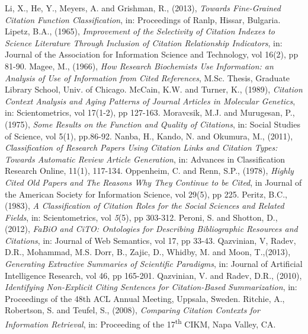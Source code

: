 \documentclass[runningheads,a4paper]{llncs}
\begin{document}
\begin{thebibliography}{4}
 Li, X., He, Y., Meyers, A. and Grishman, R., (2013), {\em Towards Fine-Grained Citation Function Classification}, in: Proceedings of Ranlp, Hissar, Bulgaria.
 Lipetz, B.A., (1965), {\em Improvement of the Selectivity of Citation Indexes to Science Literature Through Inclusion of Citation Relationship Indicators}, in: Journal of the Association for Information Science and Technology, vol 16(2), pp 81-90.
 Magee, M., (1966), {\em How Research Biochemists Use Information: an Analysis of Use of Information from Cited References}, M.Sc. Thesis, Graduate Library School, Univ. of Chicago.
 McCain, K.W. and Turner, K., (1989), {\em Citation Context Analysis and Aging Patterns of Journal Articles in Molecular Genetics}, in: Scientometrics, vol 17(1-2), pp 127-163.
 Moravcsik, M.J. and Murugesan, P., (1975), {\em Some Results on the Function and Quality of Citations}, in: Social Studies of Science, vol 5(1), pp.86-92.
 Nanba, H., Kando, N. and Okumura, M., (2011), {\em Classification of Research Papers Using Citation Links and Citation Types: Towards Automatic Review Article Generation}, in: Advances in Classification Research Online, 11(1), 117-134.
 Oppenheim, C. and Renn, S.P., (1978), {\em Highly Cited Old Papers and The Reasons Why They Continue to be Cited}, in Journal of the American Society for Information Science, vol 29(5), pp 225.
 Peritz, B.C., (1983), {\em A Classification of Citation Roles for the Social Sciences and Related Fields}, in: Scientometrics, vol {\em 5}(5), pp 303-312.
 Peroni, S. and Shotton, D., (2012), {\em FaBiO and CiTO: Ontologies for Describing Bibliographic Resources and Citations}, in: Journal of Web Semantics, vol 17, pp 33-43.
 Qazvinian, V, Radev, D.R., Mohammad, M.S. Dorr, B., Zajic, D., Whidby, M. and Moon, T.,(2013), {\em Generating Extractive Summaries of Scientific Paradigms}, in: Journal of Artificial Intelligence Research, vol 46, pp 165-201.
 Qazvinian, V. and Radev, D.R., (2010), {\em Identifying Non-Explicit Citing Sentences for Citation-Based Summarization}, in: Proceedings of the 48th ACL Annual Meeting, Uppsala, Sweden.
 Ritchie, A., Robertson, S. and Teufel, S., (2008), {\em Comparing Citation Contexts for Information Retrieval}, in: Proceeding of the 17\textsuperscript{th} CIKM, Napa Valley, CA.

\end{thebibliography}
\end{document}
